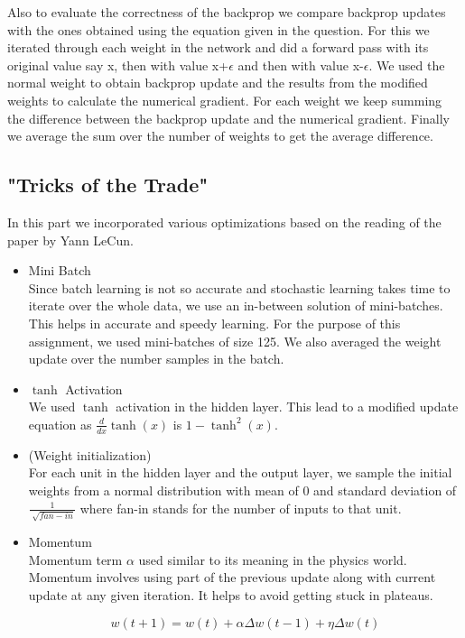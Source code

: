 \documentclass[11pt,twoside]{article}
\begin{document}
Also to evaluate the correctness of the backprop we compare backprop updates with the ones obtained using the equation given in the question. For this we iterated through each weight in the network and did a forward pass with its original value say x, then with value x+$\epsilon$ and then with value x-$\epsilon$. We used the normal weight to obtain backprop update and the results from the modified weights to calculate the numerical gradient. For each weight we keep summing the difference between the backprop update and the numerical gradient. Finally we average the sum over the number of weights to get the average difference.

\subsection{"Tricks of the Trade"}
In this part we incorporated various optimizations based on the reading of the paper by Yann LeCun.

\begin{itemize}

\item{Mini Batch}\\
Since batch learning is not so accurate and stochastic learning takes time to iterate over the whole data, we use an in-between solution of mini-batches. This helps in accurate and speedy learning.
For the purpose of this assignment, we used mini-batches of size 125. We also averaged the weight update over the number samples in the batch.

\item{$\tanh$ Activation}\\
We used $\tanh$ activation in the hidden layer. This lead to a modified update equation as $\frac{d}{dx}\tanh(x)$ is $1-\tanh^{2}(x)$.

\item(Weight initialization)\\
For each unit in the hidden layer and the output layer, we sample the initial weights from a normal distribution with mean of 0 and standard deviation of $\frac{1}{\sqrt[]{fan-in}}$ where fan-in stands for the number of inputs to that unit.

\item{Momentum}\\
Momentum term $\alpha$ used similar to its meaning in the physics world. Momentum involves using part of the previous update along with current update at any given iteration. It helps to avoid getting stuck in plateaus.

\begin{equation}
w(t+1) = w(t) + \alpha\Delta w(t-1) + \eta\Delta w(t)
\end{equation}

\end{itemize}
\end{document}
